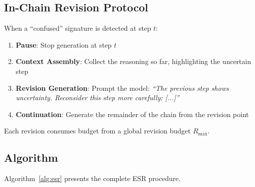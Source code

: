 \documentclass{article}
\begin{document}
\subsection{In-Chain Revision Protocol}

When a ``confused'' signature is detected at step $t$:

\begin{enumerate}
    \item \textbf{Pause}: Stop generation at step $t$
    \item \textbf{Context Assembly}: Collect the reasoning so far, highlighting the uncertain step
    \item \textbf{Revision Generation}: Prompt the model: \textit{``The previous step shows uncertainty. Reconsider this step more carefully: [...]''}
    \item \textbf{Continuation}: Generate the remainder of the chain from the revision point
\end{enumerate}

Each revision consumes budget from a global revision budget $R_{\max}$.

\subsection{Algorithm}

Algorithm~\ref{alg:esr} presents the complete ESR procedure.
\end{document}
